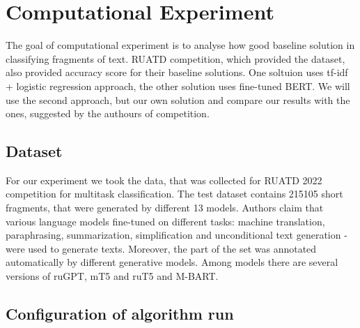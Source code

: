 \documentclass{article}
\begin{document}
\section{Computational Experiment}

The goal of computational experiment is to analyse how good baseline solution in classifying fragments of text. RUATD  competition, which provided the dataset, also provided accuracy score for their baseline solutions. One soltuion uses tf-idf + logistic regression approach, the other solution uses fine-tuned BERT. We will use the second approach, but our own solution and compare our results with the ones, suggested by the authours of competition.


\subsection{Dataset}

For our experiment we took the data, that was collected for RUATD 2022 competition\cite{ruatd-dataset} for multitask classification. The test dataset contains 215105 short fragments, that were generated by different 13 models. Authors claim that various language models fine-tuned on different tasks: machine translation, paraphrasing, summarization, simplification and unconditional text generation - were used to generate texts. Moreover, the part of the set was annotated automatically by different generative models. Among models there are several versions of ruGPT, mT5 and ruT5 and M-BART.

\subsection{Configuration of algorithm run}
\end{document}
